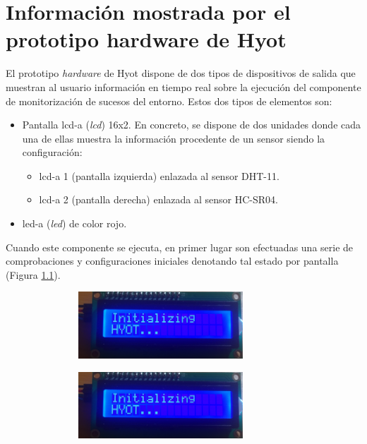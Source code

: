 \documentclass[12pt,a4paper, twoside]{report}
\begin{document}
	\chapter{Información mostrada por el prototipo hardware de Hyot}\label{hardware} 
	
	El \gls{prototipo} \textit{hardware} de Hyot dispone de dos tipos de dispositivos de salida que muestran al usuario información en tiempo real sobre la ejecución del componente de monitorización de sucesos del entorno. Estos dos tipos de elementos son:
	
	\begin{itemize}
		\item Pantalla \gls{lcd-a} (\textit{\gls{lcd}}) 16x2. En concreto, se dispone de dos unidades donde cada una de ellas muestra la información procedente de un sensor siendo la configuración:
		
		\begin{itemize}
			\item \gls{lcd-a} 1 (pantalla izquierda) enlazada al \gls{sensor} DHT-11.
			\item \gls{lcd-a} 2 (pantalla derecha) enlazada al \gls{sensor} HC-SR04.
		\end{itemize}
		
		\item \gls{led-a} (\textit{\gls{led}}) de color rojo. 
	\end{itemize}
	
	Cuando este componente se ejecuta, en primer lugar son efectuadas una serie de comprobaciones y configuraciones iniciales denotando tal estado por pantalla (Figura \ref{fig:hardware_intializing}). \\
	
	\begin{figure}[!ht]		
		\caption{Prototipo hardware Hyot - Inicialización.}
 		\begin{subfigure}{0.5\textwidth}
 			\hbox{
 				\hspace{0cm}
 				\includegraphics[width=7cm, height=2.5cm]{Images/hardware/lcd1_initializing} 
 			}
		\end{subfigure}
		\begin{subfigure}{0.5\textwidth}
			\hbox{
 				\hspace{1cm}
				\includegraphics[width=7cm, height=2.5cm]{Images/hardware/lcd1_initializing}
			}
		\end{subfigure}
		\label{fig:hardware_intializing}
	\end{figure}
	
\end{document}
